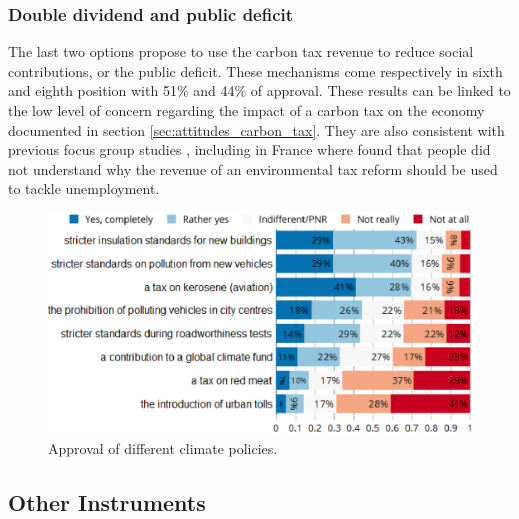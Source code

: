 \documentclass[english,5p,authoryear]{elsarticle}
\begin{document}

        \subsubsection{Double dividend and public deficit}

The last two options propose to use the carbon tax revenue to reduce social contributions, or the public deficit. These mechanisms come respectively in sixth and eighth position with 51\% and 44\% of approval. These results can be linked to the low level of concern regarding the impact of a carbon tax on the economy documented in section \ref{sec:attitudes_carbon_tax}. They are also consistent with previous focus group studies \citep[e.g.][]{kallbekken_aasen_2010}, including in France where \citet{deroubaix_rise_2006} found that people did not understand why the revenue of an environmental tax reform should be used to tackle unemployment.


\begin{figure}[t]
\centering
\includegraphics[width=\columnwidth]{Images_EPS/environmental_policies.eps}
\caption{Approval of different climate policies.}
\label{fig:policies}
\end{figure}

    \subsection{Other Instruments}

\end{document}
